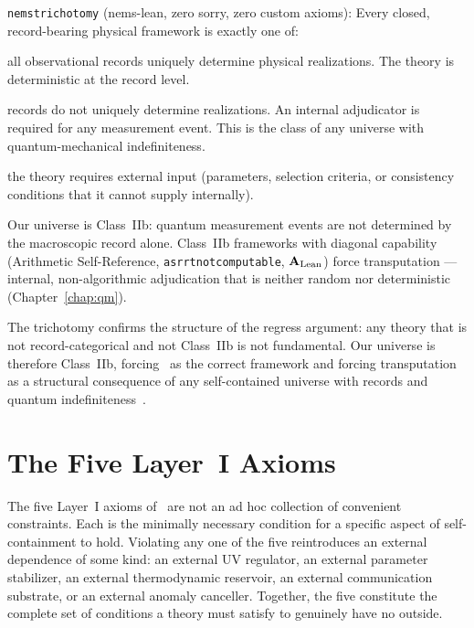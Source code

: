 \documentclass[11pt,openany]{book}
\theoremstyle{remark}
\newcommand{\PSC}{\text{PSC}}
\newcommand{\lean}[1]{%
  \penalty-100
  \begingroup\def\_{\textunderscore\allowbreak}\texttt{#1}\endgroup}
\newcommand{\CatAL}{\ensuremath{\textbf{A}_{\rm Lean}}}
\begin{document}
\begin{tcolorbox}[colback=orange!5,colframe=orange!60,
  title={Result: NEMS Trichotomy (\CatAL)},breakable]
\lean{nems\_trichotomy} (nems-lean, zero sorry, zero custom axioms):
Every closed, record-bearing physical framework is exactly one of:
\begin{description}[leftmargin=2.2cm,labelwidth=2.0cm,itemsep=3pt]
\item[Record-categorical:] all observational records uniquely determine physical
  realizations. The theory is deterministic at the record level.
\item[Class~IIb:] records do not uniquely determine realizations. An internal
  adjudicator is required for any measurement event. This is the class of any universe
  with quantum-mechanical indefiniteness.
\item[Not fundamental:] the theory requires external input (parameters, selection
  criteria, or consistency conditions that it cannot supply internally).
\end{description}
Our universe is Class~IIb: quantum measurement events are not determined by the
macroscopic record alone. Class~IIb frameworks with diagonal capability (Arithmetic
Self-Reference, \lean{asr\_rt\_not\_computable}, \CatAL) force transputation ---
internal, non-algorithmic adjudication that is neither random nor deterministic
(Chapter~\ref{chap:qm}).
\end{tcolorbox}

The trichotomy confirms the structure of the regress argument: any theory that is not
record-categorical and not Class~IIb is not fundamental. Our universe is therefore
Class~IIb, forcing \PSC\ as the correct framework and forcing transputation as a
structural consequence of any self-contained universe with records and quantum
indefiniteness~\cite{SpivackNEMS05,SpivackGTEMobius}.

\FloatBarrier

\section{The Five Layer~I Axioms}
\label{sec:axioms}

The five Layer~I axioms of \PSC\ are not an ad hoc collection of convenient
constraints. Each is the minimally necessary condition for a specific aspect of
self-containment to hold. Violating any one of the five reintroduces an external
dependence of some kind: an external UV regulator, an external parameter stabilizer,
an external thermodynamic reservoir, an external communication substrate, or an
external anomaly canceller. Together, the five constitute the complete set of
conditions a theory must satisfy to genuinely have no outside.
\end{document}
